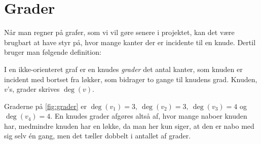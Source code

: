 \section{Grader} \label{sec:grader}
Når man regner på grafer, som vi vil gøre senere i projektet, kan det være brugbart at have styr på, hvor mange kanter der er incidente til en knude. Dertil bruger man følgende definition:

\begin{defn}[Grader] \label{defn:grader}
I en ikke-orienteret graf er en knudes \emph{grader} det antal kanter, som knuden er incident med bortset fra løkker, som bidrager to gange til knudens grad. Knuden, $v$'s, grader skrives $\deg(v)$.
\end{defn}

\begin{exmp} \label{ex:grader}

Graderne på \autoref{fig:grader} er $\deg(v_{1})=3, \ \deg(v_{2})=3, \ \deg(v_{3})=4$ og $\deg(v_{4})=4$. En knudes grader afgøres altså af, hvor mange naboer knuden har, medmindre knuden har en løkke, da man her kun siger, at den er nabo med sig selv én gang, men det tæller dobbelt i antallet af grader.




\end{exmp}